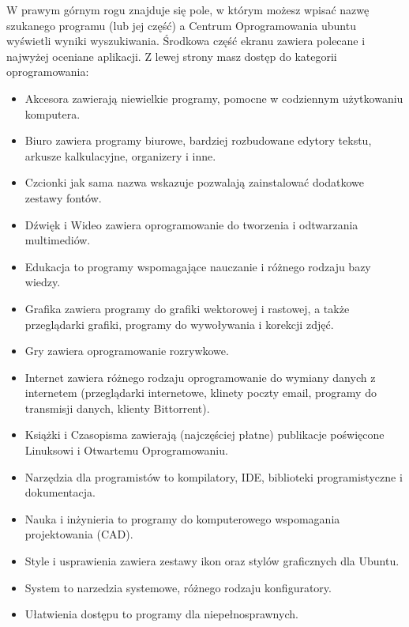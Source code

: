 W prawym górnym rogu znajduje się pole, w którym możesz wpisać nazwę szukanego programu (lub jej część) a Centrum Oprogramowania ubuntu wyświetli wyniki wyszukiwania. Środkowa część ekranu zawiera polecane i najwyżej oceniane aplikacji. Z lewej strony masz dostęp do kategorii oprogramowania:
\begin{itemize}
\item \textcolor{ubuntu_orange}{Akcesora} zawierają niewielkie programy, pomocne w codziennym użytkowaniu komputera.
\item \textcolor{ubuntu_orange}{Biuro} zawiera programy biurowe, bardziej rozbudowane edytory tekstu, arkusze kalkulacyjne, organizery i inne.
\item \textcolor{ubuntu_orange}{Czcionki} jak sama nazwa wskazuje pozwalają zainstalować dodatkowe zestawy fontów.
\item \textcolor{ubuntu_orange}{Dźwięk i Wideo} zawiera oprogramowanie do tworzenia i odtwarzania multimediów.
\item \textcolor{ubuntu_orange}{Edukacja} to programy wspomagające nauczanie i różnego rodzaju bazy wiedzy.
\item \textcolor{ubuntu_orange}{Grafika} zawiera programy do grafiki wektorowej i rastowej, a także przeglądarki grafiki, programy do wywoływania i korekcji zdjęć.
\item \textcolor{ubuntu_orange}{Gry} zawiera oprogramowanie rozrywkowe.
\item \textcolor{ubuntu_orange}{Internet} zawiera różnego rodzaju oprogramowanie do wymiany danych z internetem (przeglądarki internetowe, klinety poczty email, programy do transmisji danych, klienty Bittorrent).
\item \textcolor{ubuntu_orange}{Książki i Czasopisma} zawierają (najczęściej płatne) publikacje poświęcone Linuksowi i Otwartemu Oprogramowaniu.
\item \textcolor{ubuntu_orange}{Narzędzia dla programistów} to kompilatory, IDE, biblioteki programistyczne i dokumentacja.
\item \textcolor{ubuntu_orange}{Nauka i inżynieria} to programy do komputerowego wspomagania projektowania (CAD).
\item \textcolor{ubuntu_orange}{Style i usprawienia} zawiera zestawy ikon oraz stylów graficznych dla Ubuntu.
\item \textcolor{ubuntu_orange}{System} to narzedzia systemowe, różnego rodzaju konfiguratory.
\item \textcolor{ubuntu_orange}{Ułatwienia dostępu} to programy dla niepełnosprawnych.
\end{itemize}